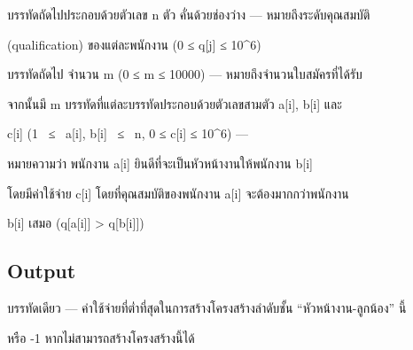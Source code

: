 \documentclass{article}
\begin{document}
บรรทัดถัดไปประกอบด้วยตัวเลข n ตัว คั่นด้วยช่องว่าง --- หมายถึงระดับคุณสมบัติ

(qualification) ของแต่ละพนักงาน (0 ≤ q{[}j{]} ≤ 10\^{}6)



บรรทัดถัดไป จำนวน m (0 ≤ m ≤ 10000) --- หมายถึงจำนวนใบสมัครที่ได้รับ



จากนั้นมี m บรรทัดที่แต่ละบรรทัดประกอบด้วยตัวเลขสามตัว a{[}i{]}, b{[}i{]} และ

c{[}i{]} (1~ ≤~ a{[}i{]}, b{[}i{]}~ ≤~ n, 0 ≤ c{[}i{]} ≤ 10\^{}6) ---

หมายความว่า พนักงาน a{[}i{]} ยินดีที่จะเป็นหัวหน้างานให้พนักงาน b{[}i{]}

โดยมีค่าใช้จ่าย c{[}i{]} โดยที่คุณสมบัติของพนักงาน a{[}i{]} จะต้องมากกว่าพนักงาน

b{[}i{]} เสมอ (q{[}a{[}i{]}{]} \textgreater{} q{[}b{[}i{]}{]})



\subsection*{Output}
บรรทัดเดียว --- ค่าใช้จ่ายที่ต่ำที่สุดในการสร้างโครงสร้างลำดับชั้น ``หัวหน้างาน-ลูกน้อง'' นี้

หรือ -1 หากไม่สามารถสร้างโครงสร้างนี้ได้\\
\end{document}
